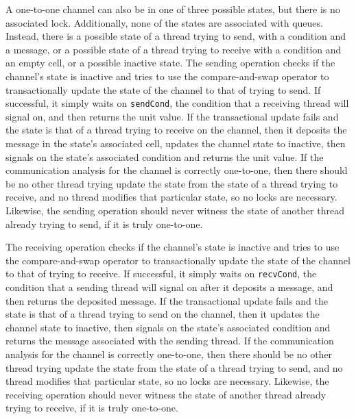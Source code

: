 \documentclass[10pt]{article}
\begin{document}
A one-to-one channel can also be in one of three possible states, but there is no associated
lock. Additionally, none of the states are associated with queues.  Instead, there is a possible
state of a thread trying to send, with a condition and a message, or a possible state of a
thread trying to receive with a condition and an empty cell, or a possible inactive state.
The sending operation checks if the channel's state is inactive and tries to use the
compare-and-swap operator to transactionally update the state of the channel to that of
trying to
send.  If successful, it simply waits on \lstinline{sendCond}, the condition that a receiving thread will
signal on, and then returns the unit value.  If the transactional update fails and the state is
that of a thread trying to receive on the channel, then it deposits the message in the state's
associated cell, updates the channel state to inactive, then signals on the state's associated
condition and returns the unit value.  If the communication analysis for the channel is
correctly one-to-one, then there should be no other thread trying update the state from the
state of a thread trying to receive, and no thread modifies that particular state, so no locks
are necessary.  Likewise, the sending operation
should never witness the state of another thread
already trying to send, if it is truly one-to-one.

The receiving operation checks if the channel's state is inactive and tries to use the
compare-and-swap operator to transactionally update the state of the channel to that of trying
to receive.  If successful, it simply waits on \lstinline{recvCond}, the condition that a sending thread
will signal on after it deposits a message, and then returns the deposited message.  If the
transactional update fails and the state is that of a thread trying to send on the channel,
then it updates the channel state to inactive, then signals on the state's associated
condition and returns the message associated with the sending thread.  If the communication
analysis for the channel is correctly one-to-one, then there should be no other thread trying
update the state from the state of a thread trying to send, and no thread modifies that
particular state, so no locks are necessary.  Likewise, the receiving operation should never
witness the state of another thread already trying to receive, if it is truly one-to-one.
\end{document}
